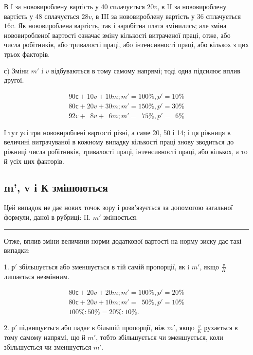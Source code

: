 
В І за нововироблену вартість у 40 сплачується $20 v$, в II
за нововироблену вартість у 48 сплачується $28 v$, в III за нововироблену
вартість у 36 сплачується $16 v$. Як нововироблена
вартість, так і заробітна плата змінились; але зміна нововиробленої
вартості означає зміну кількості витраченої праці, отже,
або числа робітників, або тривалості праці, або інтенсивності
праці, або кількох з цих трьох факторів.

с) Зміни $m'$ і $v$ відбуваються в тому самому напрямі; тоді
одна підсилює вплив другої.

\begin{gather*}
90 с + 10 v + 10 m; m' = 100\%, p' = 10\% \\
80 с + 20 v + 30 m; m' = 150\%, p' = 30\% \\
92 с + \phantom{0}8 v + \phantom{0}6 m; m' = \phantom{1}75\%, p' = \phantom{1}6\%
\end{gather*}

\noindent{}І тут усі три нововироблені вартості різні, а саме 20, 50 і 14;
і ця ріжниця в величині витрачуваної в кожному випадку кількості
праці знову зводиться до ріжниці числа робітників, тривалості
праці, інтенсивності праці, або кількох, а то й усіх цих факторів.

\subsection[m', v і К змінюються]{m', v і К змінюються\footnotemarkZ{}}

\noindent{}Цей випадок не дає нових точок зору і розв’язується за допомогою
загальної формули, даної в рубриці: II. $m'$ змінюється.

\pfbreak{}

Отже, вплив зміни величини норми додаткової вартості на
норму зиску дає такі випадки:

1. $р'$ збільшується або зменшується в тій самій пропорції, як
i $m'$, якщо $\frac{v}{K}$  лишається незмінним.

\begin{gather*}
80 с + 20 v + 20 m; m' = 100\%, p' = 20\% \\
80 с + 20 v + 10 m; m' = \phantom{1}50\%, p' = 10\% \\
100\% : 50\% = 20\% : 10\%.
\end{gather*}

2. $р'$ підвищується або падає в більшій пропорції, ніж $m'$,
якщо $\frac{v}{K}$ рухається в тому самому напрямі, що й $m'$, тобто
збільшується чи зменшується, коли збільшується чи зменшується
$m'$.

